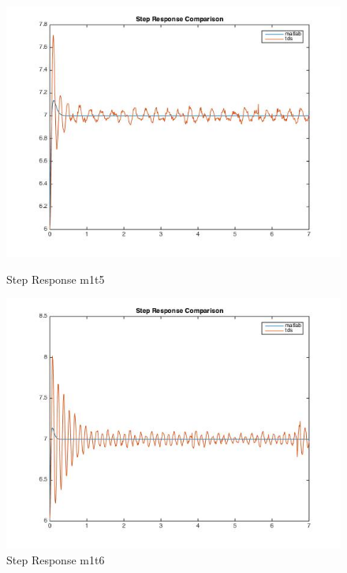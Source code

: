 \documentclass[11pt,titlepage]{article}
\begin{document}
    \begin{figure}[H]
        \centering
        \begin{minipage}{.5\textwidth}
            \centering
            \includegraphics[scale=.4]{stepM1_T5}
            \caption{Step Response m1t5}
            \label{fig:stepM1_T5}
        \end{minipage}%
        \begin{minipage}{.5\textwidth}
            \centering
            \includegraphics[scale=.4]{stepM1_T6}
            \caption{Step Response m1t6}
            \label{fig:stepM1_T6}
        \end{minipage}%
    \end{figure}
\end{document}
